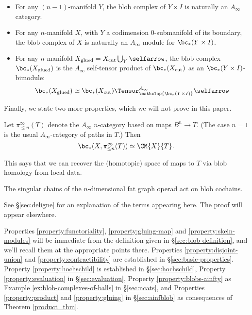 \begin{property}
\label{property:gluing}%
\mbox{}%
\begin{itemize}
\item For any $(n-1)$-manifold $Y$, the blob complex of $Y \times I$ is
naturally an $A_\infty$ category. %

\item For any $n$-manifold $X$, with $Y$ a codimension $0$-submanifold of its boundary, the blob complex of $X$ is naturally an
$A_\infty$ module for $\bc_*(Y \times I)$.

\item For any $n$-manifold $X_\text{glued} = X_\text{cut} \bigcup_Y \selfarrow$, the blob complex $\bc_*(X_\text{glued})$ is the $A_\infty$ self-tensor product of
$\bc_*(X_\text{cut})$ as an $\bc_*(Y \times I)$-bimodule:
\begin{equation*}
\bc_*(X_\text{glued}) \simeq \bc_*(X_\text{cut}) \Tensor^{A_\infty}_{\mathclap{\bc_*(Y \times I)}} \selfarrow
\end{equation*}
\end{itemize}
\end{property}

Finally, we state two more properties, which we will not prove in this paper.

\begin{property}
Let $\pi^\infty_{\le n}(T)$ denote the $A_\infty$ $n$-category based on maps 
$B^n \to T$.
(The case $n=1$ is the usual $A_\infty$-category of paths in $T$.)
Then 
$$\bc_*(X, \pi^\infty_{\le n}(T)) \simeq \CM{X}{T}.$$
\end{property}

This says that we can recover the (homotopic) space of maps to $T$ via blob homology from local data.

\begin{property}
\label{property:deligne}
The singular chains of the $n$-dimensional fat graph operad act on blob cochains.
\end{property}
See \S \ref{sec:deligne} for an explanation of the terms appearing here. The proof will appear elsewhere.

Properties \ref{property:functoriality}, \ref{property:gluing-map} and \ref{property:skein-modules} will be immediate from the definition given in
\S \ref{sec:blob-definition}, and we'll recall them at the appropriate points there. 
Properties \ref{property:disjoint-union} and \ref{property:contractibility} are established in \S \ref{sec:basic-properties}.
Property \ref{property:hochschild} is established in \S \ref{sec:hochschild}, Property \ref{property:evaluation} in \S \ref{sec:evaluation}, Property \ref{property:blobs-ainfty} as Example \ref{ex:blob-complexes-of-balls} in \S \ref{sec:ncats},
and Properties \ref{property:product} and \ref{property:gluing} in \S \ref{sec:ainfblob} as consequences of Theorem \ref{product_thm}.

